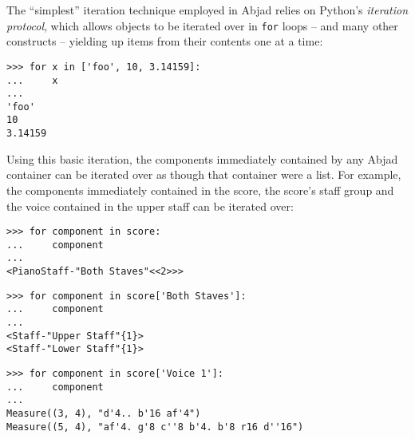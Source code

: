 \noindent The \enquote{simplest} iteration technique employed in Abjad relies
on Python's \emph{iteration protocol}, which allows objects to be iterated over
in \texttt{for} loops -- and many other constructs -- yielding up items from
their contents one at a time:

\begin{comment}
<abjad>
for x in ['foo', 10, 3.14159]:
    x

</abjad>
\end{comment}

\begin{abjadbookoutput}
\begin{singlespacing}
\vspace{-0.5\baselineskip}
\begin{lstlisting}
>>> for x in ['foo', 10, 3.14159]:
...     x
...
'foo'
10
3.14159
\end{lstlisting}
\end{singlespacing}
\end{abjadbookoutput}

\noindent Using this basic iteration, the components immediately contained by
any Abjad container can be iterated over as though that container were a list.
For example, the components immediately contained in the score, the score's
staff group and the voice contained in the upper staff can be iterated over:

\begin{comment}
<abjad>
for component in score:
    component

for component in score['Both Staves']:
    component

for component in score['Voice 1']:
    component

</abjad>
\end{comment}

\begin{abjadbookoutput}
\begin{singlespacing}
\vspace{-0.5\baselineskip}
\begin{lstlisting}
>>> for component in score:
...     component
...
<PianoStaff-"Both Staves"<<2>>>
\end{lstlisting}
\begin{lstlisting}
>>> for component in score['Both Staves']:
...     component
...
<Staff-"Upper Staff"{1}>
<Staff-"Lower Staff"{1}>
\end{lstlisting}
\begin{lstlisting}
>>> for component in score['Voice 1']:
...     component
...
Measure((3, 4), "d'4.. b'16 af'4")
Measure((5, 4), "af'4. g'8 c''8 b'4. b'8 r16 d''16")
\end{lstlisting}
\end{singlespacing}
\end{abjadbookoutput}

